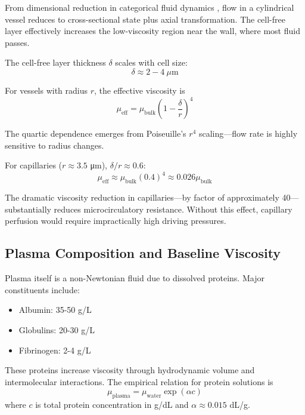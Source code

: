 \documentclass[10pt,twocolumn,a4paper]{article}
\theoremstyle{remark}
\begin{document}
From dimensional reduction in categorical fluid dynamics \cite{sachikonye2024fluid}, flow in a cylindrical vessel reduces to cross-sectional state plus axial transformation. The cell-free layer effectively increases the low-viscosity region near the wall, where most fluid passes.

The cell-free layer thickness $\delta$ scales with cell size:
\begin{equation}
\delta \approx 2-4~\mu\mathrm{m}
\end{equation}

For vessels with radius $r$, the effective viscosity is
\begin{equation}
\mu_{\mathrm{eff}} = \mu_{\mathrm{bulk}}\left(1 - \frac{\delta}{r}\right)^{4}
\end{equation}

The quartic dependence emerges from Poiseuille's $r^{4}$ scaling—flow rate is highly sensitive to radius changes.

For capillaries ($r \approx 3.5$ μm), $\delta/r \approx 0.6$:
\begin{equation}
\mu_{\mathrm{eff}} \approx \mu_{\mathrm{bulk}}(0.4)^{4} \approx 0.026\mu_{\mathrm{bulk}}
\end{equation}

The dramatic viscosity reduction in capillaries—by factor of approximately 40—substantially reduces microcirculatory resistance. Without this effect, capillary perfusion would require impractically high driving pressures.

\subsection{Plasma Composition and Baseline Viscosity}

Plasma itself is a non-Newtonian fluid due to dissolved proteins. Major constituents include:
\begin{itemize}
\item Albumin: 35-50 g/L
\item Globulins: 20-30 g/L
\item Fibrinogen: 2-4 g/L
\end{itemize}

These proteins increase viscosity through hydrodynamic volume and intermolecular interactions. The empirical relation for protein solutions is
\begin{equation}
\mu_{\mathrm{plasma}} = \mu_{\mathrm{water}} \exp(\alpha c)
\end{equation}
where $c$ is total protein concentration in g/dL and $\alpha \approx 0.015$ dL/g.
\end{document}
